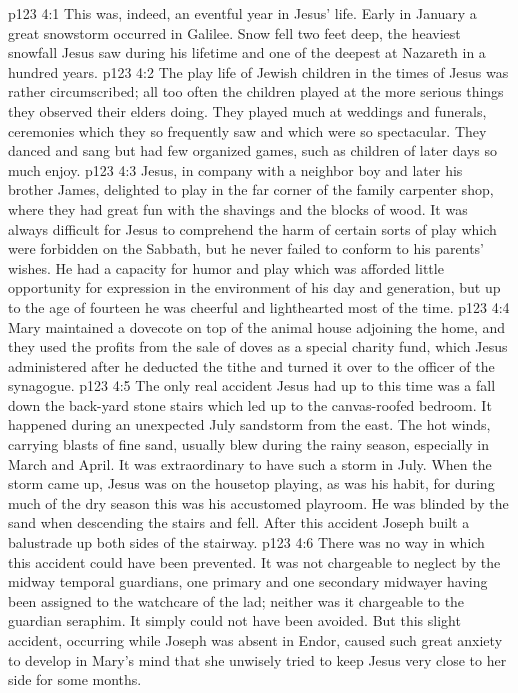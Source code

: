 \vs p123 4:1 This was, indeed, an eventful year in Jesus’ life. Early in January a great snowstorm occurred in Galilee. Snow fell two feet deep, the heaviest snowfall Jesus saw during his lifetime and one of the deepest at Nazareth in a hundred years.
\vs p123 4:2 The play life of Jewish children in the times of Jesus was rather circumscribed; all too often the children played at the more serious things they observed their elders doing. They played much at weddings and funerals, ceremonies which they so frequently saw and which were so spectacular. They danced and sang but had few organized games, such as children of later days so much enjoy.
\vs p123 4:3 Jesus, in company with a neighbor boy and later his brother James, delighted to play in the far corner of the family carpenter shop, where they had great fun with the shavings and the blocks of wood. It was always difficult for Jesus to comprehend the harm of certain sorts of play which were forbidden on the Sabbath, but he never failed to conform to his parents’ wishes. He had a capacity for humor and play which was afforded little opportunity for expression in the environment of his day and generation, but up to the age of fourteen he was cheerful and lighthearted most of the time.
\vs p123 4:4 Mary maintained a dovecote on top of the animal house adjoining the home, and they used the profits from the sale of doves as a special charity fund, which Jesus administered after he deducted the tithe and turned it over to the officer of the synagogue.
\pc \vs p123 4:5 The only real accident Jesus had up to this time was a fall down the back\hyp{}yard stone stairs which led up to the canvas\hyp{}roofed bedroom. It happened during an unexpected July sandstorm from the east. The hot winds, carrying blasts of fine sand, usually blew during the rainy season, especially in March and April. It was extraordinary to have such a storm in July. When the storm came up, Jesus was on the housetop playing, as was his habit, for during much of the dry season this was his accustomed playroom. He was blinded by the sand when descending the stairs and fell. After this accident Joseph built a balustrade up both sides of the stairway.
\vs p123 4:6 There was no way in which this accident could have been prevented. It was not chargeable to neglect by the midway temporal guardians, one primary and one secondary midwayer having been assigned to the watchcare of the lad; neither was it chargeable to the guardian seraphim. It simply could not have been avoided. But this slight accident, occurring while Joseph was absent in Endor, caused such great anxiety to develop in Mary’s mind that she unwisely tried to keep Jesus very close to her side for some months.
